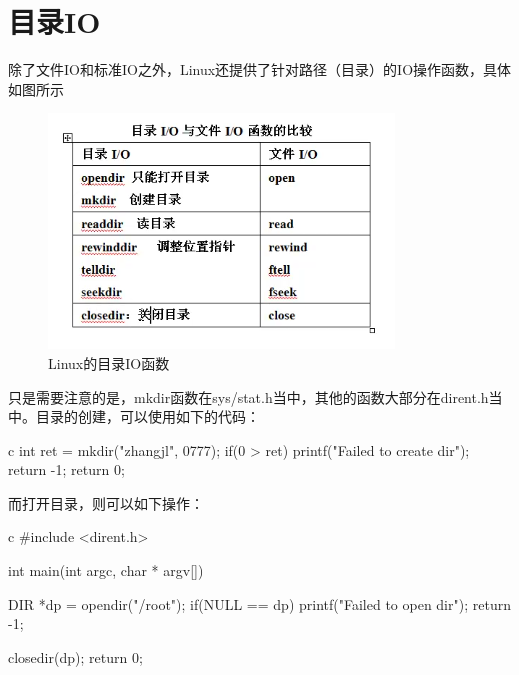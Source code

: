 \section{目录IO}
除了文件IO和标准IO之外，Linux还提供了针对路径（目录）的IO操作函数，具体如图所示
\begin{figure}[H]
  \centering
  \includegraphics[width=\linewidth]{dirio.png}
  \caption{Linux的目录IO函数}
  \label{fig:dirio}
\end{figure}

只是需要注意的是，mkdir函数在sys/stat.h当中，其他的函数大部分在dirent.h当中。目录的创建，可以使用如下的代码：
\begin{code-block}{c}
int ret = mkdir("zhangjl", 0777);
if(0 > ret)
{
        printf("Failed to create dir\n");
        return -1;
}
return 0;
\end{code-block}

而打开目录，则可以如下操作：
\begin{code-block}{c}
#include <dirent.h>

int main(int argc, char * argv[])
{
        DIR *dp = opendir("/root");
        if(NULL ==  dp)
        {
                printf("Failed to open dir\n");
                return -1;
        }

        closedir(dp);
        return 0;
}
\end{code-block}


